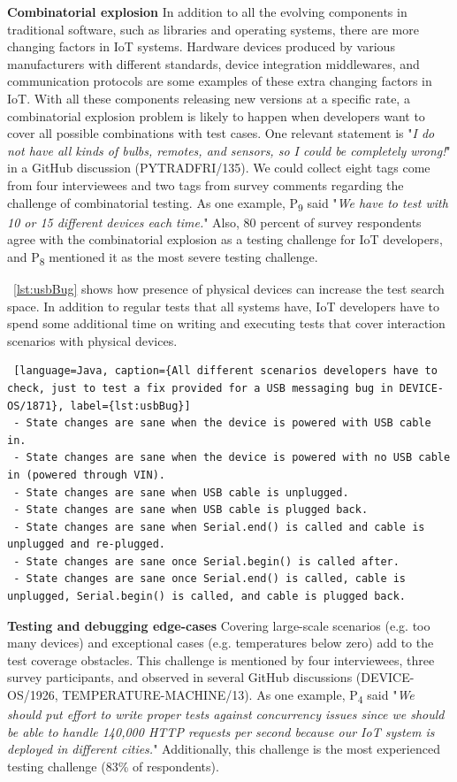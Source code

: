 {\textbf{Combinatorial explosion}
In addition to all the evolving components in traditional software, such as libraries and operating systems, there are more changing factors in IoT systems. Hardware devices produced by various manufacturers with different standards, device integration middlewares, and communication protocols are some examples of these extra changing factors in IoT. With all these components releasing new versions at a specific rate, a combinatorial explosion problem is likely to happen when developers want to cover all possible combinations with test cases.
One relevant statement is "\emph{I do not have all kinds of bulbs, remotes, and sensors, so I could be completely wrong!}" in a GitHub discussion (PYTRADFRI/135). We could collect eight tags come from four interviewees and two tags from survey comments regarding the challenge of combinatorial testing. As one example, P\textsubscript{9} said "\emph{We have to test with 10 or 15 different devices each time.}" Also, 80 percent of survey respondents agree with the combinatorial explosion as a testing challenge for IoT developers, and P\textsubscript{8} mentioned it as the most severe testing challenge. 

~\autoref{lst:usbBug} shows how presence of physical devices can increase the test search space. In addition to regular tests that all systems have, IoT developers have to spend some additional time on writing and executing tests that cover interaction scenarios with physical devices.

\begin{lstlisting} [language=Java, caption={All different scenarios developers have to check, just to test a fix provided for a USB messaging bug in DEVICE-OS/1871}, label={lst:usbBug}] 
 - State changes are sane when the device is powered with USB cable in.
 - State changes are sane when the device is powered with no USB cable in (powered through VIN).
 - State changes are sane when USB cable is unplugged.
 - State changes are sane when USB cable is plugged back.
 - State changes are sane when Serial.end() is called and cable is unplugged and re-plugged. 
 - State changes are sane once Serial.begin() is called after.
 - State changes are sane once Serial.end() is called, cable is unplugged, Serial.begin() is called, and cable is plugged back.
\end{lstlisting}

\textbf{Testing and debugging edge-cases}
Covering large-scale scenarios (e.g. too many devices) and exceptional cases (e.g. temperatures below zero) add to the test coverage obstacles. This challenge is mentioned by four interviewees, three survey participants, and observed in several GitHub discussions (DEVICE-OS/1926, TEMPERATURE-MACHINE/13). As one example, P\textsubscript{4} said "\emph{We should put effort to write proper tests against concurrency issues since we should be able to handle 140,000 HTTP requests per second because our IoT system is deployed in different cities.}" Additionally, this challenge is the most experienced testing challenge (83\% of respondents). 



}
